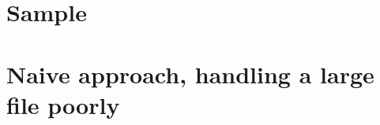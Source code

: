 \appendix
\section{Sample}

\section{Naive approach, handling a large file poorly}
\label{appendix:A}

